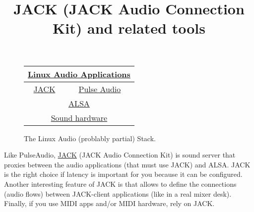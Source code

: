 \title{JACK (JACK Audio Connection Kit) and related tools}

\maketitle

\begin{figure}
  \begin{center}
    \begin{tabular}{|c|c|}
      \hline
      \multicolumn{2}{c}{\href{https://en.wikipedia.org/wiki/List\_of\_Linux\_audio\_software}{Linux Audio Applications}} \\
      \hline
      \href{https://jackaudio.org/}{JACK} & \href{https://www.freedesktop.org/wiki/Software/PulseAudio/}{Pulse Audio} \\
      \hline
      \multicolumn{2}{c}{\href{https://www.alsa-project.org}{ALSA}} \\
      \hline
      \multicolumn{2}{c}{\href{https://www.alsa-project.org/wiki/Matrix:Main}{Sound hardware}} \\
      \hline
    \end{tabular}
  \end{center}
  \caption{The Linux Audio (problably partial) Stack.}
  \label{fig:stack}
\end{figure}

Like PulseAudio, \href{http://jackaudio.org/}{JACK} (JACK Audio
Connection Kit) \cite{letz2005jack} is sound server that proxies
between the audio applications (that must use JACK) and ALSA. JACK is
the right choice if latency is important for you because it can be
configured. Another interesting feature of JACK is that allows to
define the connections (audio flows) between JACK-client applications
(like in a real mixer desk). Finally, if you use MIDI apps and/or MIDI
hardware, rely on JACK.

